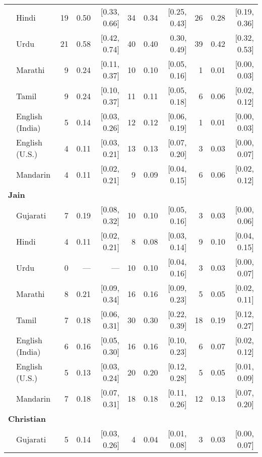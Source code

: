 \begin{table}[t]
\begin{footnotesize}
\begin{tabular}{p{.1in}lrrrrrrrrr}
 & Hindi & 19 & 0.50 & [0.33, 0.66] & 34 & 0.34 & [0.25, 0.43] & 26 & 0.28 & [0.19, 0.36]\\

 & Urdu & 21 & 0.58 & [0.42, 0.74] & 40 & 0.40 & 0.30, 0.49] & 39 & 0.42 & [0.32, 0.53]\\

 & Marathi & 9 & 0.24 & [0.11, 0.37] & 10 & 0.10 & [0.05, 0.16] & 1 & 0.01 & [0.00, 0.03]\\

 & Tamil & 9 & 0.24 & [0.10, 0.37] & 11 & 0.11 & [0.05, 0.18] & 6 & 0.06 & [0.02, 0.12]\\

 & English (India) & 5 & 0.14 & [0.03, 0.26] & 12 & 0.12 & [0.06, 0.19] & 1 & 0.01 & [0.00, 0.03]\\

 & English (U.S.) & 4 & 0.11 & [0.03, 0.21] & 13 & 0.13 & [0.07, 0.20] & 3 & 0.03 & [0.00, 0.07]\\
 & Mandarin & 4 & 0.11 & [0.02, 0.21] & 9 & 0.09 & [0.04, 0.15] & 6 & 0.06 & [0.02, 0.12]\\
 \midrule
\multicolumn{11}{l}{\textbf{Jain}}\\
  & Gujarati & 7 & 0.19 & [0.08, 0.32] & 10 & 0.10 & [0.05, 0.16] & 3 & 0.03 & [0.00, 0.06]\\

 & Hindi & 4 & 0.11 & [0.02, 0.21] & 8 & 0.08 & [0.03, 0.14] & 9 & 0.10 & [0.04, 0.15]\\

 & Urdu & 0 & --- & --- & 10 & 0.10 & [0.04, 0.16] & 3 & 0.03 & [0.00, 0.07]\\

 & Marathi & 8 & 0.21 & [0.09, 0.34] & 16 & 0.16 & [0.09, 0.23] & 5 & 0.05 & [0.02, 0.11]\\

 & Tamil & 7 & 0.18 & [0.06, 0.31] & 30 & 0.30 & [0.22, 0.39] & 18 & 0.19 & [0.12, 0.27]\\

 & English (India) & 6 & 0.16 & [0.05, 0.30] & 16 & 0.16 & [0.10, 0.23] & 6 & 0.07 & [0.02, 0.12]\\

 & English (U.S.) & 5 & 0.13 & [0.03, 0.24] & 20 & 0.20 & [0.12, 0.28] & 5 & 0.05 & [0.01, 0.09]\\

& Mandarin & 7 & 0.18 & [0.07, 0.31] & 18 & 0.18 & [0.11, 0.26] & 12 & 0.13 & [0.07, 0.20]\\
 \midrule
\multicolumn{11}{l}{\textbf{Christian}}\\
 & Gujarati & 5 & 0.14 & [0.03, 0.26] & 4 & 0.04 & [0.01, 0.08] & 3 & 0.03 & [0.00, 0.07]\\


\end{tabular}
\end{footnotesize}
\end{table}
